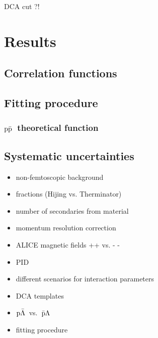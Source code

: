 \documentclass[ALICE,manyauthors]{ALICE_analysis_notes}
\newcommand{\pap}{$\rm p\bar{\rm p}$}
\newcommand{\pal}{$\rm p\bar{\rm \Lambda}$}
\newcommand{\apl}{$\bar{\rm p }\Lambda$}
\begin{document}



DCA cut ?!

\section{Results}

\subsection{Correlation functions}

\subsection{Fitting procedure}

\subsubsection{\pap~theoretical function}

\subsection{Systematic uncertainties}
\begin{itemize}
\item non-femtoscopic background
\item fractions (Hijing vs. Therminator)
\item number of secondaries from material
\item momentum resolution correction
\item ALICE magnetic fields ++ vs. - - 
\item PID
\item different scenarios for interaction parameters
\item DCA templates
\item \pal~vs.~\apl
\item fitting procedure    
\end{itemize}
\end{document}
